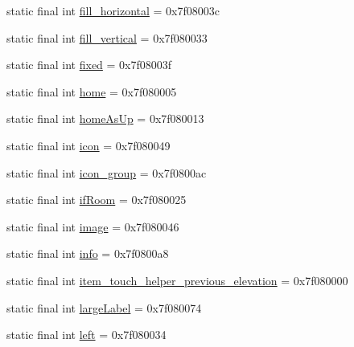 \begin{CompactItemize}
\item 
static final int \hyperlink{classandroid_1_1support_1_1graphics_1_1drawable_1_1animated_1_1_r_1_1id_6279ea825cd9fe4256e016ce0062c835}{fill\_\-horizontal} = 0x7f08003c
\item 
static final int \hyperlink{classandroid_1_1support_1_1graphics_1_1drawable_1_1animated_1_1_r_1_1id_2ed83e7395cb8537b798ff99f3f0fa15}{fill\_\-vertical} = 0x7f080033
\item 
static final int \hyperlink{classandroid_1_1support_1_1graphics_1_1drawable_1_1animated_1_1_r_1_1id_85d5a64faecf84b9abe0bc36dbe0c7e3}{fixed} = 0x7f08003f
\item 
static final int \hyperlink{classandroid_1_1support_1_1graphics_1_1drawable_1_1animated_1_1_r_1_1id_d0d6b95eaf71e874952ee593f75db164}{home} = 0x7f080005
\item 
static final int \hyperlink{classandroid_1_1support_1_1graphics_1_1drawable_1_1animated_1_1_r_1_1id_a97af371114c6a1594a30b18a2c99d0a}{homeAsUp} = 0x7f080013
\item 
static final int \hyperlink{classandroid_1_1support_1_1graphics_1_1drawable_1_1animated_1_1_r_1_1id_f23de4d5a9f01fe263d7ed4946aadfa7}{icon} = 0x7f080049
\item 
static final int \hyperlink{classandroid_1_1support_1_1graphics_1_1drawable_1_1animated_1_1_r_1_1id_6b1f19f66de88e0fadaf7a7fa4d2f012}{icon\_\-group} = 0x7f0800ac
\item 
static final int \hyperlink{classandroid_1_1support_1_1graphics_1_1drawable_1_1animated_1_1_r_1_1id_e8bea16e5f53607eb7fefee7542814c9}{ifRoom} = 0x7f080025
\item 
static final int \hyperlink{classandroid_1_1support_1_1graphics_1_1drawable_1_1animated_1_1_r_1_1id_b8764a89720235b1909d27956dbfdd79}{image} = 0x7f080046
\item 
static final int \hyperlink{classandroid_1_1support_1_1graphics_1_1drawable_1_1animated_1_1_r_1_1id_b349cd3d63dc7e3ceb823dc16700d779}{info} = 0x7f0800a8
\item 
static final int \hyperlink{classandroid_1_1support_1_1graphics_1_1drawable_1_1animated_1_1_r_1_1id_39854e156d13e4a2f24b38cb67012113}{item\_\-touch\_\-helper\_\-previous\_\-elevation} = 0x7f080000
\item 
static final int \hyperlink{classandroid_1_1support_1_1graphics_1_1drawable_1_1animated_1_1_r_1_1id_fc95d05ec83ac4779c3cfc73938f4cf4}{largeLabel} = 0x7f080074
\item 
static final int \hyperlink{classandroid_1_1support_1_1graphics_1_1drawable_1_1animated_1_1_r_1_1id_56df7f456a3656c228da338c49ab9fad}{left} = 0x7f080034

\end{CompactItemize}
